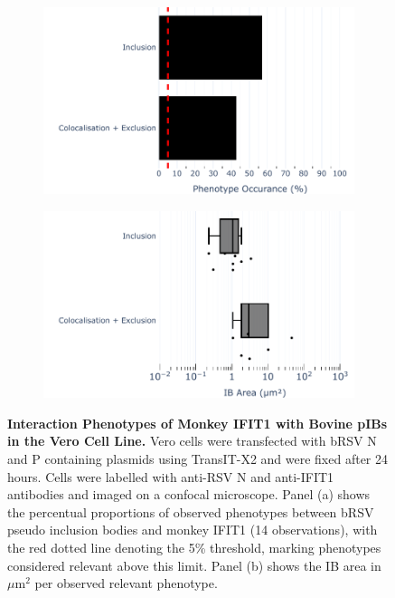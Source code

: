 \begin{figure}
    \begin{subfigure}{0.495\textwidth}
        \caption{}
        \includegraphics[width=1\linewidth]{09. Chapter 4/Figs/01. pIB/02. IFIT1/07. bar_i1_vero_bnbp.pdf}  
    \end{subfigure}
    \begin{subfigure}{0.495\textwidth}
        \caption{}
        \includegraphics[width=1\linewidth]{09. Chapter 4/Figs/01. pIB/02. IFIT1/08. box_i1_vero_bnbp.pdf}
    \end{subfigure}
    \caption[Interaction Phenotypes of Monkey IFIT1 with Bovine pIBs in the Vero Cell Line.]{\textbf{Interaction Phenotypes of Monkey IFIT1 with Bovine pIBs in the Vero Cell Line.} Vero cells were transfected with bRSV N and P containing plasmids using TransIT-X2 and were fixed after 24 hours. Cells were labelled with anti-RSV N and anti-IFIT1 antibodies and imaged on a confocal microscope. Panel (a) shows the percentual proportions of observed phenotypes between bRSV pseudo inclusion bodies and monkey IFIT1 (14 observations), with the red dotted line denoting the 5\% threshold, marking phenotypes considered relevant above this limit. Panel (b) shows the IB area in \(\mu \mbox{m}^2\) per observed relevant phenotype.}
    \label{fig:Interaction Phenotypes of Monkey IFIT1 with Bovine pIBs in the VERO Cell Line}
\end{figure}


